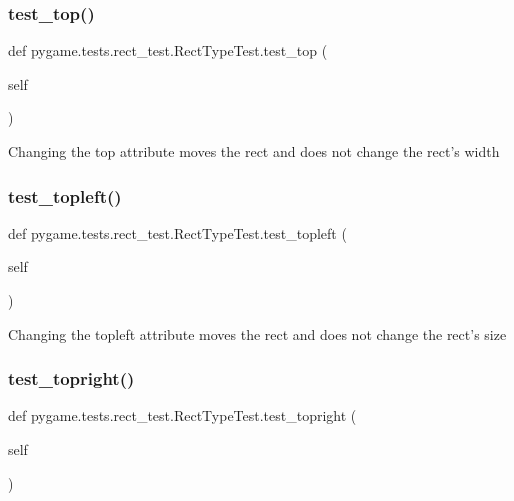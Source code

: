 \subsubsection{\texorpdfstring{test\+\_\+top()}{test\_top()}}
{\footnotesize\ttfamily def pygame.\+tests.\+rect\+\_\+test.\+Rect\+Type\+Test.\+test\+\_\+top (\begin{DoxyParamCaption}\item[{}]{self }\end{DoxyParamCaption})}

\begin{DoxyVerb}Changing the top attribute moves the rect and does not change
   the rect's width
\end{DoxyVerb}
 \mbox{\label{classpygame_1_1tests_1_1rect__test_1_1_rect_type_test_a4e13a35dc91996e10e61348f3c18620a}} 
\subsubsection{\texorpdfstring{test\+\_\+topleft()}{test\_topleft()}}
{\footnotesize\ttfamily def pygame.\+tests.\+rect\+\_\+test.\+Rect\+Type\+Test.\+test\+\_\+topleft (\begin{DoxyParamCaption}\item[{}]{self }\end{DoxyParamCaption})}

\begin{DoxyVerb}Changing the topleft attribute moves the rect and does not change
   the rect's size
\end{DoxyVerb}
 \mbox{\label{classpygame_1_1tests_1_1rect__test_1_1_rect_type_test_a916e127793522d732adf8ac6646559ff}} 
\subsubsection{\texorpdfstring{test\+\_\+topright()}{test\_topright()}}
{\footnotesize\ttfamily def pygame.\+tests.\+rect\+\_\+test.\+Rect\+Type\+Test.\+test\+\_\+topright (\begin{DoxyParamCaption}\item[{}]{self }\end{DoxyParamCaption})}

